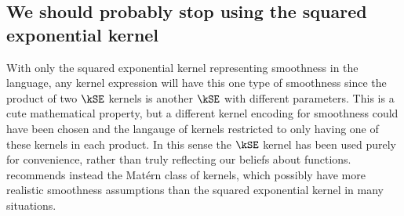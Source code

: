 \subsection{We should probably stop using the squared exponential kernel}

With only the squared exponential kernel representing smoothness in the language, any kernel expression will have this one type of smoothness since the product of two $\kSE$ kernels is another $\kSE$ with different parameters.
This is a cute mathematical property, but a different kernel encoding for smoothness could have been chosen and the langauge of kernels restricted to only having one of these kernels in each product.
In this sense the $\kSE$ kernel has been used purely for convenience, rather than truly reflecting our beliefs about functions.
\citet{Stein1999-ps} recommends instead the Mat\'ern class of kernels, which possibly have more realistic smoothness assumptions than the squared exponential kernel in many situations.



\outbpdocument{


}

